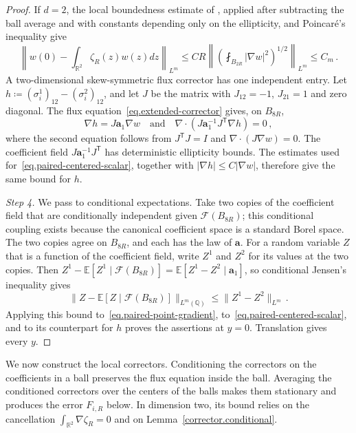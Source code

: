 \documentclass[11pt]{amsart}
\theoremstyle{definition}
\theoremstyle{remark}
\numberwithin{equation}{section}
\newcommand{\E}{\mathbb E}
\newcommand{\Q}{\mathbb Q}
\newcommand{\R}{\mathbb R}
\renewcommand{\a}{\mathbf a}
\begin{document}
\begin{proof}
If $d=2$, the local boundedness estimate of \citet[Theorem~8.17]{GilbargTrudinger2001}, applied after subtracting the ball average and with constants depending only on the ellipticity, and Poincar\'e's inequality give
\begin{equation}\label{eq.paired-centered-scalar}
 \left\|w(0)-\int_{\R^2}\zeta_R(z)w(z)dz\right\|_{L^m}
 \leq CR\left\|\left(\fint_{B_{2R}}|\nabla w|^2\right)^{1/2}\right\|_{L^m}
 \leq C_m\, .
\end{equation}
A two-dimensional skew-symmetric flux corrector has one independent entry. Let $h\coloneqq(\sigma_i^1)_{12}-(\sigma_i^2)_{12}$, and let $J$ be the matrix with $J_{12}=-1$, $J_{21}=1$ and zero diagonal. The flux equation~\eqref{eq.extended-corrector} gives, on $B_{8R}$,
\begin{equation*}
 \nabla h=J\a_1\nabla w
 \quad\text{and}\quad
 \nabla\cdot(J\a_1^{-1}J^{\mathsf T}\nabla h)=0\, ,
\end{equation*}
where the second equation follows from $J^{\mathsf T}J=I$ and $\nabla\cdot(J\nabla w)=0$. The coefficient field $J\a_1^{-1}J^{\mathsf T}$ has deterministic ellipticity bounds. The estimates used for~\eqref{eq.paired-centered-scalar}, together with $|\nabla h|\leq C|\nabla w|$, therefore give the same bound for $h$.

\emph{Step 4.} We pass to conditional expectations. Take two copies of the coefficient field that are conditionally independent given $\mathcal F(B_{8R})$; this conditional coupling exists because the canonical coefficient space is a standard Borel space. The two copies agree on $B_{8R}$, and each has the law of $\a$. For a random variable $Z$ that is a function of the coefficient field, write $Z^1$ and $Z^2$ for its values at the two copies. Then $Z^1-\E[Z^1\mid\mathcal F(B_{8R})]=\E[Z^1-Z^2\mid\a_1]$, so conditional Jensen's inequality gives
\begin{equation*}
 \|Z-\E[Z\mid\mathcal F(B_{8R})]\|_{L^m(\Q)}\leq\|Z^1-Z^2\|_{L^m}\, .
\end{equation*}
Applying this bound to~\eqref{eq.paired-point-gradient}, to~\eqref{eq.paired-centered-scalar}, and to its counterpart for $h$ proves the assertions at $y=0$. Translation gives every $y$.
\end{proof}

We now construct the local correctors. Conditioning the correctors on the coefficients in a ball preserves the flux equation inside the ball. Averaging the conditioned correctors over the centers of the balls makes them stationary and produces the error $F_{i,R}$ below. In dimension two, its bound relies on the cancellation $\int_{\R^2}\nabla\zeta_R=0$ and on Lemma~\ref{corrector.conditional}.
\end{document}

